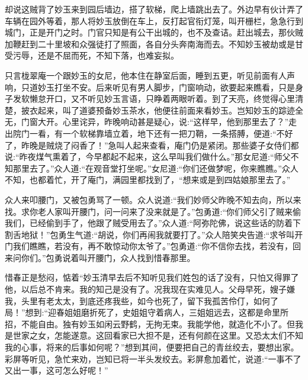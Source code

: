 \begin{parag}
    却说这贼背了妙玉来到园后墙边，搭了软梯，爬上墙跳出去了。外边早有伙计弄了车辆在园外等着，那人将妙玉放倒在车上，反打起官衔灯笼，叫开栅栏，急急行到城门，正是开门之时。门官只知是有公干出城的，也不及查诘。赶出城去，那伙贼加鞭赶到二十里坡和众强徒打了照面，各自分头奔南海而去。不知妙玉被劫或是甘受污辱，还是不屈而死，不知下落，也难妄拟。
\end{parag}


\begin{parag}
    只言栊翠庵一个跟妙玉的女尼，他本住在静室后面，睡到五更，听见前面有人声响，只道妙玉打坐不安。后来听见有男人脚步，门窗响动，欲要起来瞧看，只是身子发软懒怠开口，又不听见妙玉言语，只睁着两眼听着。到了天亮，终觉得心里清楚，披衣起来，叫了道婆预备妙玉茶水，他便往前面来看妙玉。岂知妙玉的踪迹全无，门窗大开。心里诧异，昨晚响动甚是疑心，说:“这样早，他到那里去了？”走出院门一看，有一个软梯靠墙立着，地下还有一把刀鞘，一条搭膊，便道:“不好了，昨晚是贼烧了闷香了！”急叫人起来查看，庵门仍是紧闭。那些婆子女侍们都说:“昨夜煤气熏着了，今早都起不起来，这么早叫我们做什么。”那女尼道:“师父不知那里去了。”众人道:“在观音堂打坐呢。”女尼道:“你们还做梦呢，你来瞧瞧。”众人不知，也都着忙，开了庵门，满园里都找到了，“想来或是到四姑娘那里去了。”
\end{parag}


\begin{parag}
    众人来叩腰门，又被包勇骂了一顿。众人说道:“我们妙师父昨晚不知去向，所以来找。求你老人家叫开腰门，问一问来了没来就是了。”包勇道:“你们师父引了贼来偷我们，已经偷到手了，他跟了贼受用去了。”众人道:“阿弥陀佛，说这些话的防着下割舌地狱！”包勇生气道:“胡说，你们再闹我就要打了。”众人陪笑央告道:“求爷叫开门我们瞧瞧，若没有，再不敢惊动你太爷了。”包勇道:“你不信你去找，若没有，回来问你们。”包勇说着叫开腰门，众人找到惜春那里。
\end{parag}


\begin{parag}
    惜春正是愁闷，惦着“妙玉清早去后不知听见我们姓包的话了没有，只怕又得罪了他，以后总不肯来。我的知己是没有了。况我现在实难见人。父母早死，嫂子嫌我，头里有老太太，到底还疼我些，如今也死了，留下我孤苦伶仃，如何了局！”想到:“迎春姐姐磨折死了，史姐姐守着病人，三姐姐远去，这都是命里所招，不能自由。独有妙玉如闲云野鹤，无拘无束。我能学他，就造化不小了。但我是世家之女，怎能遂意。这回看家已大担不是，还有何颜在这里。又恐太太们不知我的心事，将来的后事如何呢？”想到其间，便要把自己的青丝绞去，要想出家。彩屏等听见，急忙来劝，岂知已将一半头发绞去。彩屏愈加着忙，说道:“一事不了又出一事，这可怎么好呢！”
\end{parag}


